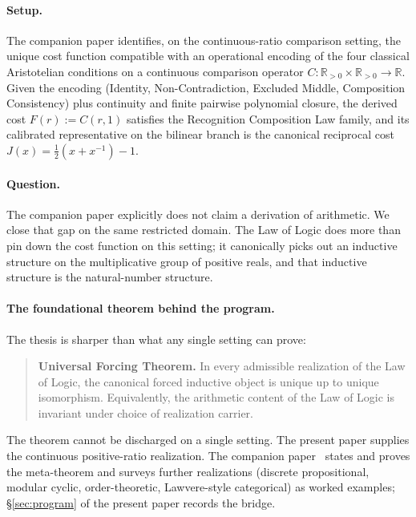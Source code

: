 \documentclass[11pt,a4paper]{article}
\theoremstyle{definition}
\theoremstyle{remark}
\begin{document}
\paragraph{Setup.} The companion paper \cite{Washburn2026LogicFE}
identifies, on the continuous-ratio comparison setting, the unique
cost function compatible with an operational encoding of the four
classical Aristotelian conditions on a continuous comparison operator
$C : \mathbb{R}_{>0} \times \mathbb{R}_{>0} \to \mathbb{R}$. Given the
encoding (Identity, Non-Contradiction, Excluded Middle, Composition
Consistency) plus continuity and finite pairwise polynomial closure,
the derived cost $F(r) := C(r, 1)$ satisfies the Recognition
Composition Law family, and its calibrated representative on the
bilinear branch is the canonical reciprocal cost
$J(x) = \tfrac{1}{2}(x + x^{-1}) - 1$.

\paragraph{Question.} The companion paper explicitly does not claim a
derivation of arithmetic. We close that gap on the same restricted
domain. The Law of Logic does more than pin down the cost function on
this setting; it canonically picks out an inductive structure on the
multiplicative group of positive reals, and that inductive structure is
the natural-number structure.

\paragraph{The foundational theorem behind the program.} The thesis
is sharper than what any single setting can prove:

\begin{quote}
\textbf{Universal Forcing Theorem.} In every admissible realization
of the Law of Logic, the canonical forced inductive object is unique
up to unique isomorphism. Equivalently, the arithmetic content of
the Law of Logic is invariant under choice of realization carrier.
\end{quote}

The theorem cannot be discharged on a single setting. The present
paper supplies the continuous positive-ratio realization. The
companion paper~\cite{Washburn2026UniversalForcing} states and
proves the meta-theorem and surveys further realizations (discrete
propositional, modular cyclic, order-theoretic, Lawvere-style
categorical) as worked examples;
\S\ref{sec:program} of the present paper records the bridge.
\end{document}
